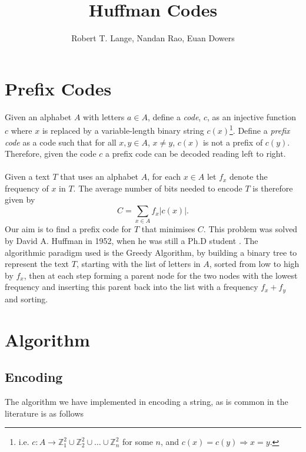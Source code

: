 \documentclass[paper=a4, fontsize=10pt]{article} %
\title{Huffman Codes}
\author{Robert T. Lange, Nandan Rao, Euan Dowers}
\date{}
\numberwithin{equation}{section} %
\numberwithin{figure}{section} %
\numberwithin{table}{section} %
\begin{document}
\maketitle %

\section{Prefix Codes}

Given an alphabet $A$ with letters $a \in A$, define a \textit{code}, $c$, as an injective function $c$ where $x$ is replaced by a variable-length binary string $c(x)$\footnote{i.e. $c:A \rightarrow \mathbb{Z}^2_1 \cup \mathbb{Z}^2_2 \cup \ldots \cup \mathbb{Z}^2_n$ for some $n$, and $c(x) = c(y) \Rightarrow x=y$. }. Define a \textit{prefix code} as a code such that for all $x,y \in A$, $x \neq y$, $c(x)$ is not a prefix of $c(y)$. Therefore, given the code $c$ a prefix code can be decoded reading left to right. 
\\
\\
Given a text $T$ that uses an alphabet $A$, for each $x \in A$ let $f_x$ denote the frequency of $x$ in $T$. The average number of bits needed to encode $T$ is therefore given by
\[
C = \sum _ {x \in A} f_x | c(x) |.
\]
Our aim is to find a prefix code for $T$ that minimises $C$. This problem was solved by David A. Huffman in 1952, when he was still a Ph.D student \cite{huffman52}. The algorithmic paradigm used is the Greedy Algorithm, by building a binary tree to represent the text $T$, starting with the list of letters in $A$, sorted from low to high by $f_x$, then at each step forming a parent node for the two nodes with the lowest frequency and inserting this parent back into the list with a frequency $f_x + f_y$ and sorting. 
\section{Algorithm}
\subsection{Encoding}
The algorithm we have implemented in encoding a string, as is common in the literature \cite{huffman52}\cite{mackay} is as follows
\end{document}
